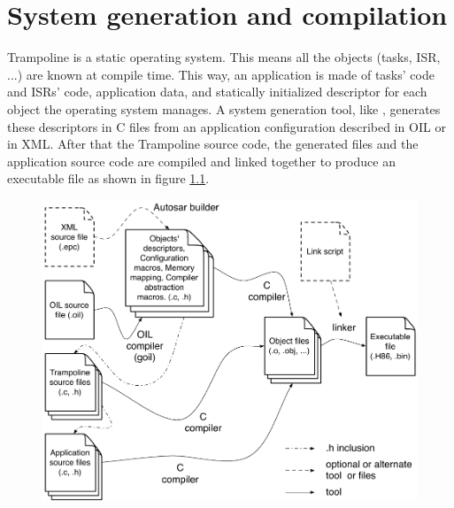 
\chapter{System generation and compilation}

Trampoline is a static operating system. This means all the objects (tasks, ISR, ...) are known at compile time. This way, an application is made of tasks' code and ISRs' code, application data, and statically initialized descriptor for each object the operating system manages. A system generation tool, like \goil, generates these descriptors in C files from an application configuration described in OIL or in XML. After that the Trampoline source code, the generated files and the application source code are compiled and linked together to produce an executable file as shown in figure \ref{fig:buildtrampoline}.

\begin{figure}[htbp] %
   \centering
   \label{fig:buildtrampoline}
  \includegraphics[width=4.5in]{pictures/buildProcess.pdf} 
\end{figure}

